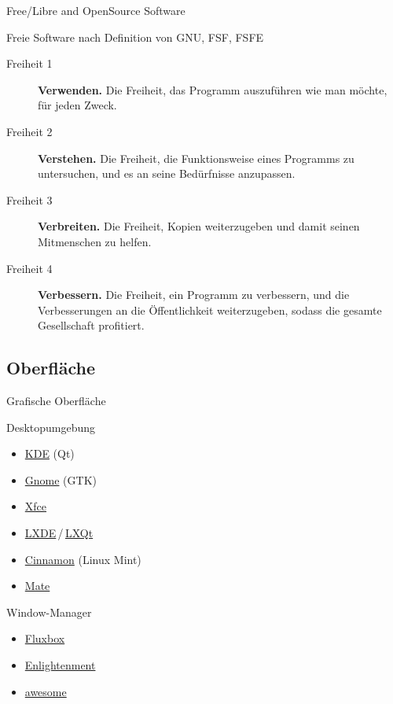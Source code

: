 \documentclass{beamer}
\makeatletter
\newcommand{\strong}[1]{\@strong{#1}}
\newcommand{\@@strong}[1]{\textbf{\let\@strong\@@@strong#1}}
\newcommand{\@@@strong}[1]{\textnormal{\let\@strong\@@strong#1}}
\let\@strong\@@strong
\makeatother
\begin{document}
\begin{frame}{Free/Libre and OpenSource Software}
    \begin{block}{Freie Software nach Definition von GNU, FSF, FSFE}
        \begin{description}
            \item[Freiheit 1] \strong{Verwenden.} {\small Die Freiheit,
                das Programm auszuführen wie man möchte, für jeden
                Zweck.}
            \item[Freiheit 2] \strong{Verstehen.} {\small Die Freiheit,
                die Funktionsweise eines Programms zu untersuchen, und
                es an seine Bedürfnisse anzupassen.}
            \item[Freiheit 3] \strong{Verbreiten.} {\small Die Freiheit,
                Kopien weiterzugeben und damit seinen Mitmenschen zu
                helfen.}
            \item[Freiheit 4] \strong{Verbessern.} {\small Die Freiheit,
                ein Programm zu verbessern, und die Verbesserungen
                an die Öffentlichkeit weiterzugeben, sodass die
                gesamte Gesellschaft profitiert.}
        \end{description}
    \end{block}
\end{frame}

\subsection{Oberfläche}

\begin{frame}{Grafische Oberfläche}
    \begin{block}{Desktopumgebung}
        \begin{itemize}
            \item \href{https://www.kde.org/}{KDE} (Qt)
            \item \href{https://www.gnome.org/}{Gnome} (GTK)
            \item \href{https://xfce.org/}{Xfce}
            \item
                \href{https://lxde.org/}{LXDE}\,/\,\href{https://lxqt.org/}{LXQt}
            \item \href{https://github.com/linuxmint/Cinnamon}{Cinnamon}
                (Linux Mint)
            \item \href{http://mate-desktop.org/}{Mate}
        \end{itemize}
    \end{block}
    \pause
    \begin{block}{Window-Manager}
        \begin{itemize}
            \item \href{http://fluxbox.org/}{Fluxbox}
            \item \href{https://www.enlightenment.org/}{Enlightenment}
            \item \href{https://awesomewm.org/}{awesome}
        \end{itemize}
    \end{block}
\end{frame}
\end{document}
